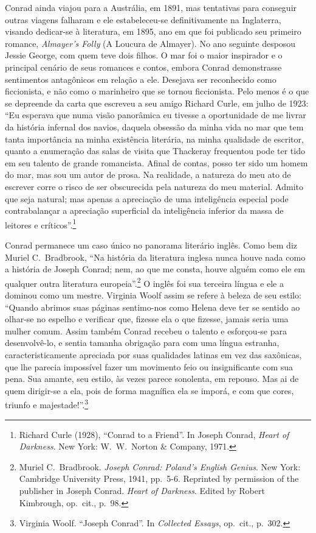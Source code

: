 Conrad ainda viajou para a Austrália, em 1891, mas tentativas
para conseguir outras viagens falharam e ele estabeleceu{}-se
definitivamente na Inglaterra, visando dedicar{}-se à literatura, em
1895, ano em que foi publicado seu primeiro romance, \textit{Almayer's Folly} 
(A Loucura de Almayer). No ano seguinte  desposou Jessie George, com quem 
teve dois filhos. O mar foi o maior inspirador e o principal cenário de seus romances 
e contos, embora Conrad demonstrasse sentimentos antagônicos em relação a ele.
Desejava ser reconhecido como ficcionista, e não como o marinheiro que
se tornou ficcionista. Pelo menos é o que se depreende da carta que
escreveu a seu amigo Richard Curle, em julho de 1923: ``Eu esperava que
numa visão panorâmica eu tivesse a oportunidade de me livrar da
história infernal dos navios, daquela obsessão da minha vida no mar que
tem tanta importância na minha existência literária, na minha qualidade
de escritor, quanto a enumeração  das  salas de visita que Thackeray
frequentou pode ter tido em seu talento de grande romancista. Afinal de
contas, posso ter sido um homem do mar, mas sou um autor de prosa. Na
realidade, a natureza do meu ato de escrever corre o risco de ser
obscurecida pela natureza do meu material. Admito que seja natural; mas
apenas a apreciação de uma inteligência especial pode contrabalançar a
apreciação superficial da inteligência inferior da massa de leitores e
críticos''.\footnote{ Richard Curle (1928), ``Conrad  to a Friend''. 
In Joseph Conrad, \textit{Heart of Darkness}. New York: W.~W.~Norton \& Company, 1971.}


Conrad permanece um caso único no panorama literário inglês.
Como bem diz Muriel C.~Bradbrook, ``Na história da literatura inglesa
nunca houve nada como a história de Joseph Conrad; nem, ao que me
consta, houve alguém como ele em qualquer outra literatura
europeia''.\footnote{ Muriel C.~Bradbrook. \textit{Joseph Conrad: Poland's English Genius}.
New York: Cambridge University Press, 1941, pp.~5{}-6. Reprinted by
permission of the publisher in Joseph Conrad. \textit{Heart of
Darkness}. Edited by Robert Kimbrough, op.~cit., p.~98.}
O inglês foi sua terceira língua e ele a dominou como um
mestre.  Virginia Woolf assim se refere à beleza de seu estilo: ``Quando
abrimos suas páginas sentimo{}-nos como Helena deve ter se sentido ao
olhar{}-se no espelho e verificar que, fizesse ela o que fizesse,
jamais seria uma mulher comum. Assim também Conrad recebeu o talento e
esforçou{}-se para desenvolvê{}-lo, e sentia tamanha  obrigação para
com uma língua estranha, caracteristicamente apreciada por
suas qualidades latinas em vez das saxônicas, que lhe parecia
impossível fazer um movimento feio ou insignificante com sua pena. Sua
amante, seu estilo,  às vezes parece sonolenta, em repouso. Mas ai de
quem dirigir{}-se a ela, pois de forma magnífica ela se imporá, e com
que cores, triunfo e majestade!''.\footnote{ Virginia Woolf. ``Joseph Conrad''. 
In \textit{Collected Essays}, op.~cit., p.~302.}

